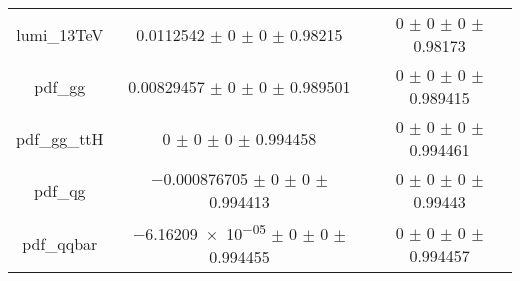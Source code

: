 \begin{table}
\begin{tabular}{ccc}
lumi\_13TeV & \num{0.0112542} $\pm$ \num{0} $\pm$ \num{0} $\pm$ \num{0.98215} & \num{0} $\pm$ \num{0} $\pm$ \num{0} $\pm$ \num{0.98173}\\
pdf\_gg & \num{0.00829457} $\pm$ \num{0} $\pm$ \num{0} $\pm$ \num{0.989501} & \num{0} $\pm$ \num{0} $\pm$ \num{0} $\pm$ \num{0.989415}\\
pdf\_gg\_ttH & \num{0} $\pm$ \num{0} $\pm$ \num{0} $\pm$ \num{0.994458} & \num{0} $\pm$ \num{0} $\pm$ \num{0} $\pm$ \num{0.994461}\\
pdf\_qg & \num{-0.000876705} $\pm$ \num{0} $\pm$ \num{0} $\pm$ \num{0.994413} & \num{0} $\pm$ \num{0} $\pm$ \num{0} $\pm$ \num{0.99443}\\
pdf\_qqbar & \num{-6.16209e-05} $\pm$ \num{0} $\pm$ \num{0} $\pm$ \num{0.994455} & \num{0} $\pm$ \num{0} $\pm$ \num{0} $\pm$ \num{0.994457}\\
\bottomrule
\end{tabular}
\end{table}